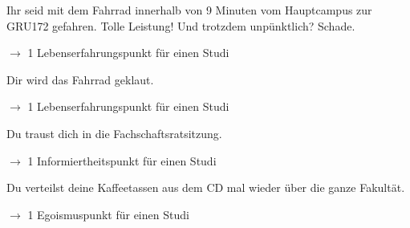 \documentclass[a4paper,12pt]{article}
\begin{document}
    Ihr seid mit dem Fahrrad innerhalb von 9 Minuten vom
    Hauptcampus zur GRU172 gefahren. Tolle Leistung! Und trotzdem
    unp\"unktlich? Schade.

    $\rightarrow$ 1 Lebenserfahrungspunkt f\"ur einen Studi
    \vspace{10mm}



    Dir wird das Fahrrad geklaut.

    $\rightarrow$ 1 Lebenserfahrungspunkt f\"ur einen Studi
    \vspace{10mm}



    Du traust dich in die Fachschaftsratsitzung.

    $\rightarrow$ 1 Informiertheitspunkt f\"ur einen Studi
    \vspace{10mm}


    \enlargethispage{1.5cm}

    Du verteilst deine Kaffeetassen aus dem CD mal wieder
    \"uber die ganze Fakult\"at.

    $\rightarrow$ 1 Egoismuspunkt f\"ur einen Studi
    \vspace{10mm}
\end{document}
